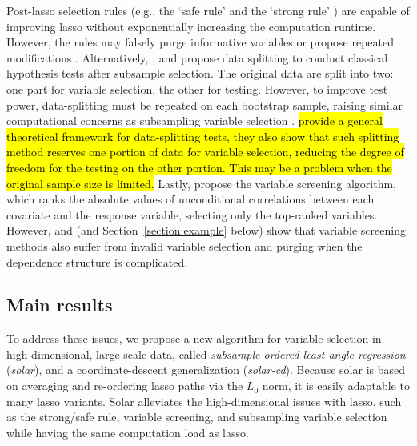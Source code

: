 \documentclass[12pt]{article}
\begin{document}
Post-lasso selection rules (e.g., the `safe rule' \citep{ghaoui2010safe} and the `strong rule' \citep{tibshirani2012strong}) are capable of improving lasso without exponentially increasing the computation runtime. However, the rules may falsely purge informative variables or propose repeated modifications \citep{wang2014safe, zeng2017efficient}. Alternatively, \citet{wasserman2009high}, \citet{meinshausen2009p} and \citet{barber2019knockoff} propose data splitting to conduct classical hypothesis tests after subsample selection. The original data are split into two: one part for variable selection, the other for testing. However, to improve test power, data-splitting must be repeated on each bootstrap sample, raising similar computational concerns as subsampling variable selection \citep{bach2008bolasso,meinshausen2010stability}. \citet{diciccio2020exact} \hl{provide a general theoretical framework for data-splitting tests, they also show that such splitting method reserves one portion of data for variable selection, reducing the degree of freedom for the testing on the other portion. This may be a problem when the original sample size is limited.} Lastly, \citet{fan2008sure} propose the variable screening algorithm, which ranks the absolute values of unconditional correlations between each covariate and the response variable, selecting only the top-ranked variables. However, \citet{fan2008sure} and \citet{barut2016conditional} (and Section~\ref{section:example} below) show that variable screening methods also suffer from invalid variable selection and purging when the dependence structure is complicated.

\subsection{Main results}

To address these issues, we propose a new algorithm for variable selection in high-dimensional, large-scale data, called \emph{subsample-ordered least-angle regression} (\emph{solar}), and a coordinate-descent generalization (\emph{solar-cd}). Because solar is based on averaging and re-ordering lasso paths via the $L_0$ norm, it is easily adaptable to many lasso variants. Solar alleviates the high-dimensional issues with lasso, such as the strong/safe rule, variable screening, and subsampling variable selection while having the same computation load as lasso.
\end{document}
